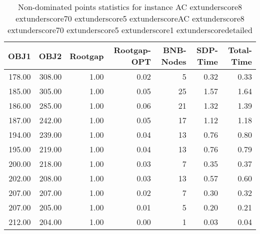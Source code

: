 \begin{table}
\caption{Non-dominated points statistics for instance AC	extunderscore8	extunderscore70	extunderscore5	extunderscoreAC	extunderscore8	extunderscore70	extunderscore5	extunderscore1	extunderscoredetailed}
\label{tab:stats/AC_8_70_5_AC_8_70_5_1_detailed}
\begin{tabular}{rrrrrrr}
\toprule
OBJ1 & OBJ2 & Rootgap & Rootgap-OPT & BNB-Nodes & SDP-Time & Total-Time \\
\midrule
178.00 & 308.00 & 1.00 & 0.02 & 5 & 0.32 & 0.33 \\
185.00 & 305.00 & 1.00 & 0.05 & 25 & 1.57 & 1.64 \\
186.00 & 285.00 & 1.00 & 0.06 & 21 & 1.32 & 1.39 \\
187.00 & 242.00 & 1.00 & 0.05 & 17 & 1.12 & 1.18 \\
194.00 & 239.00 & 1.00 & 0.04 & 13 & 0.76 & 0.80 \\
195.00 & 219.00 & 1.00 & 0.04 & 13 & 0.76 & 0.79 \\
200.00 & 218.00 & 1.00 & 0.03 & 7 & 0.35 & 0.37 \\
202.00 & 208.00 & 1.00 & 0.03 & 13 & 0.57 & 0.60 \\
207.00 & 207.00 & 1.00 & 0.02 & 7 & 0.30 & 0.32 \\
207.00 & 205.00 & 1.00 & 0.01 & 5 & 0.20 & 0.21 \\
212.00 & 204.00 & 1.00 & 0.00 & 1 & 0.03 & 0.04 \\
\bottomrule
\end{tabular}
\end{table}
